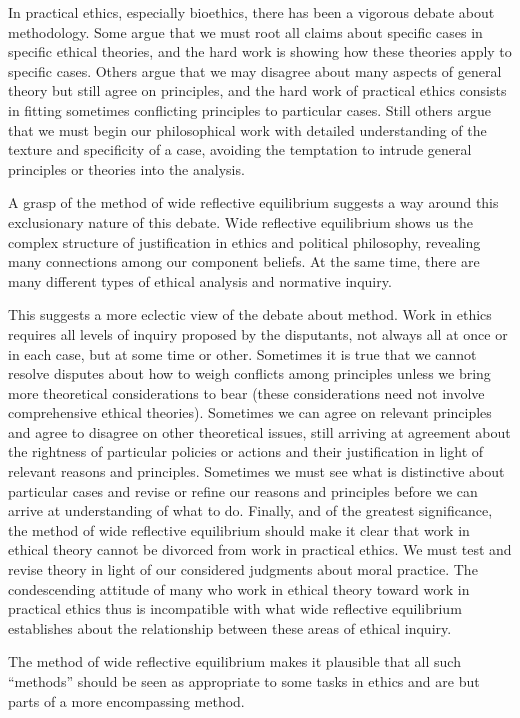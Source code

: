 \documentclass[]{article}
\begin{document}
In practical ethics, especially bioethics, there has been a vigorous
debate about methodology. Some argue that we must root all claims about
specific cases in specific ethical theories, and the hard work is
showing how these theories apply to specific cases. Others argue that we
may disagree about many aspects of general theory but still agree on
principles, and the hard work of practical ethics consists in fitting
sometimes conflicting principles to particular cases. Still others argue
that we must begin our philosophical work with detailed understanding of
the texture and specificity of a case, avoiding the temptation to
intrude general principles or theories into the analysis.

A grasp of the method of wide reflective equilibrium suggests a way
around this exclusionary nature of this debate. Wide reflective
equilibrium shows us the complex structure of justification in ethics
and political philosophy, revealing many connections among our component
beliefs. At the same time, there are many different types of ethical
analysis and normative inquiry.

This suggests a more eclectic view of the debate about method. Work in
ethics requires all levels of inquiry proposed by the disputants, not
always all at once or in each case, but at some time or other. Sometimes
it is true that we cannot resolve disputes about how to weigh conflicts
among principles unless we bring more theoretical considerations to bear
(these considerations need not involve comprehensive ethical theories).
Sometimes we can agree on relevant principles and agree to disagree on
other theoretical issues, still arriving at agreement about the
rightness of particular policies or actions and their justification in
light of relevant reasons and principles. Sometimes we must see what is
distinctive about particular cases and revise or refine our reasons and
principles before we can arrive at understanding of what to do. Finally,
and of the greatest significance, the method of wide reflective
equilibrium should make it clear that work in ethical theory cannot be
divorced from work in practical ethics. We must test and revise theory
in light of our considered judgments about moral practice. The
condescending attitude of many who work in ethical theory toward work in
practical ethics thus is incompatible with what wide reflective
equilibrium establishes about the relationship between these areas of
ethical inquiry.

The method of wide reflective equilibrium makes it plausible that all
such ``methods'' should be seen as appropriate to some tasks in ethics
and are but parts of a more encompassing method.
\end{document}
